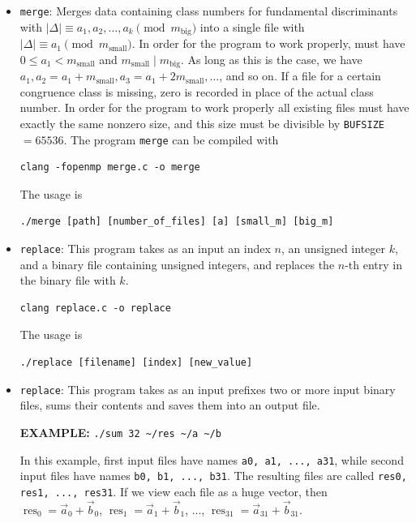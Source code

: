 \documentclass[a4paper,10pt]{article}
\newcommand{\code}{\lstinline}
\begin{document}
\begin{itemize}
\begin{itemize}
\item \code{merge}: Merges data containing class numbers for fundamental discriminants with $|\Delta| \equiv a_1, a_2, \ldots, a_k \pmod{m_{\text{big}}}$ into a single file with $|\Delta| \equiv a_1 \pmod{m_{\text{small}}}$. In order for the program to work properly, must have $0 \leq a_1 < m_{\text{small}}$ and $m_{\text{small}} \mid m_{\text{big}}$. As long as this is the case, we have $a_1, a_2 = a_1 + m_{\text{small}}, a_3 = a_1 + 2m_{\text{small}}, \ldots$, and so on. If a file for a certain congruence class is missing, zero is recorded in place of the actual class number. In order for the program to work properly all existing files must have exactly the same nonzero size, and this size must be divisible by \code{BUFSIZE}$=65536$. The program \code{merge} can be compiled with

\begin{verbatim}
clang -fopenmp merge.c -o merge
\end{verbatim}

The usage is

\begin{verbatim}
./merge [path] [number_of_files] [a] [small_m] [big_m]
\end{verbatim}





\item \code{replace}: This program takes as an input an index $n$, an unsigned integer $k$, and a binary file containing unsigned integers, and replaces the $n$-th entry in the binary file with $k$.

\begin{verbatim}
clang replace.c -o replace
\end{verbatim}

The usage is

\begin{verbatim}
./replace [filename] [index] [new_value]
\end{verbatim}





\item \code{replace}: This program takes as an input prefixes two or more input binary files, sums their contents and saves them into an output file.

\textbf{EXAMPLE:} \code{./sum 32 ~/res ~/a ~/b}

In this example, first input files have names \code{a0, a1, ..., a31}, while second input files have names \code{b0, b1, ..., b31}. The resulting files are called \code{res0, res1, ..., res31}. If we view each file as a huge vector, then $\operatorname{res}_0=\vec a_0+\vec b_0$, $\operatorname{res}_1=\vec a_1+\vec b_1$, ..., $\operatorname{res}_{31}=\vec a_{31}+\vec b_{31}$. 


\end{itemize}
\end{itemize}
\end{document}
